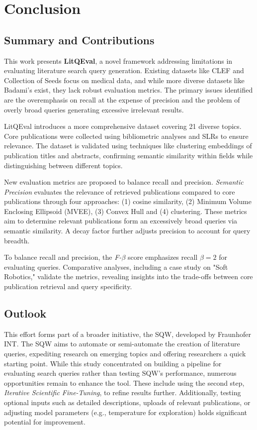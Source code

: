 \chapter{Conclusion}\label{ch:conclusion}

\section{Summary and Contributions}
This work presents \textbf{LitQEval}, a novel framework addressing limitations in evaluating literature search query generation. Existing datasets like CLEF and Collection of Seeds focus on medical data, and while more diverse datasets like Badami’s \autocite{badami2023adaptive} exist, they lack robust evaluation metrics. The primary issues identified are the overemphasis on recall at the expense of precision and the problem of overly broad queries generating excessive irrelevant results. 

LitQEval introduces a more comprehensive dataset covering 21 diverse topics. Core publications were collected using bibliometric analyses and SLRs to ensure relevance. The dataset is validated using techniques like clustering embeddings of publication titles and abstracts, confirming semantic similarity within fields while distinguishing between different topics.

New evaluation metrics are proposed to balance recall and precision. \textit{Semantic Precision} evaluates the relevance of retrieved publications compared to core publications through four approaches: (1) cosine similarity, (2) Minimum Volume Enclosing Ellipsoid (MVEE), (3) Convex Hull and (4) clustering. These metrics aim to determine relevant publications form an excessively broad queries via semantic similarity. A decay factor further adjusts precision to account for query breadth.

To balance recall and precision, the \textit{ F-$\beta$ }score emphasizes recall $\beta=2$ for evaluating queries. Comparative analyses, including a case study on "Soft Robotics," validate the metrics, revealing insights into the trade-offs between core publication retrieval and query specificity.

\section{Outlook}
This effort forms part of a broader initiative, the SQW, developed by Fraunhofer INT. The SQW aims to automate or semi-automate the creation of literature queries, expediting research on emerging topics and offering researchers a quick starting point. While this study concentrated on building a pipeline for evaluating search queries rather than testing SQW's performance, numerous opportunities remain to enhance the tool. These include using the second step, \textit{Iterative Scientific Fine-Tuning}, to refine results further. Additionally, testing optional inputs such as detailed descriptions, uploads of relevant publications, or adjusting model parameters (e.g., temperature for exploration) holds significant potential for improvement.

